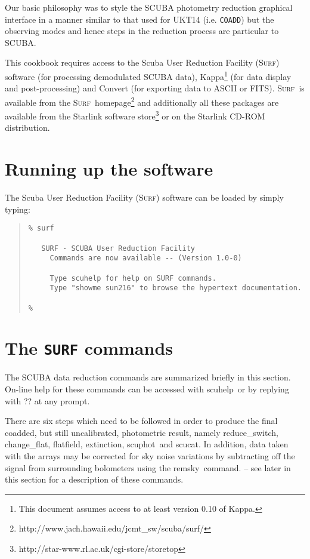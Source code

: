 \documentclass[twoside,11pt,fleqn]{article}
\newenvironment{myquote}{\begin{quote}\begin{small}}{\end{small}\end{quote}}
\newcommand{\Kappa}{\xref{{\sc Kappa}}{sun95}{}}
\newcommand{\convert}{\xref{{\sc Convert}}{sun55}{}}
\newcommand{\surf}{\xref{\textsc{Surf}}{sun216}{}}
\newcommand{\task}[1]{{\sf #1}}
\newcommand{\chgflat}{\xref{\task{change\_flat}}{sun216}{CHANGE_FLAT}}
\newcommand{\resw}{\xref{\task{reduce\_switch}}{sun216}{REDUCE_SWITCH}}
\newcommand{\flatf}{\xref{\task{flatfield}}{sun216}{FLATFIELD}}
\newcommand{\scuphot}{\xref{\task{scuphot}}{sun216}{SCUPHOT}}
\newcommand{\ext}{\xref{\task{extinction}}{sun216}{EXTINCTION}}
\newcommand{\scuhelp}{\xref{\task{scuhelp}}{sun216}{SCUHELP}}
\newcommand{\remsky}{\xref{\task{remsky}}{sun216}{REMSKY}}
\newcommand{\scucat}{\xref{\task{scucat}}{sun216}{SCUCAT}}
\newcommand{\htmladdnormallinkfoot}[2]{#1\footnote{#2}}
\newcommand{\htmladdnormallink}[2]{#1}
\newcommand{\xref}[3]{#1}
\begin{document}
Our basic philosophy was to style the SCUBA photometry reduction
graphical interface in a manner similar to that used for UKT14 \cite{ukt14}
(i.e. {\tt COADD}) but the observing modes and hence steps in the
reduction process are particular to SCUBA. 

This cookbook requires access to the Scuba User Reduction Facility (\surf) software
\cite{surf} (for processing demodulated SCUBA data), \Kappa \cite{kappa}\footnote{This
document assumes access to at least version 0.10 of Kappa.} (for data display
and post-processing) and \convert\cite{convert} (for exporting data to ASCII or FITS).
\surf\ is available from the \surf\
\htmladdnormallinkfoot{homepage}{http://www.jach.hawaii.edu/jcmt\_sw/scuba/surf/} 
and additionally all these packages are available from the 
\htmladdnormallinkfoot{Starlink software store}{http://star-www.rl.ac.uk/cgi-store/storetop}
or on the \htmladdnormallink{Starlink}{http://star-www.rl.ac.uk} CD-ROM distribution.

\section{Running up the software}

The Scuba User Reduction Facility (\surf) software can be loaded
by simply typing:

\begin{myquote}
\begin{verbatim}
% surf
 
   SURF - SCUBA User Reduction Facility
     Commands are now available -- (Version 1.0-0)
 
     Type scuhelp for help on SURF commands.
     Type "showme sun216" to browse the hypertext documentation.

% 
\end{verbatim} 
\end{myquote}

\section{The {\tt SURF} commands}

The SCUBA data reduction commands are summarized briefly in this
section. On-line help for these commands can be accessed with \scuhelp\
or by replying with ?? at any prompt.

There are six steps which need to be followed in order to produce the final
coadded, but still uncalibrated, photometric result, namely \resw, \chgflat,
\flatf, \ext, \scuphot\ and \scucat. In addition, data taken with the arrays
may be corrected for sky noise variations by subtracting off the signal from
surrounding bolometers using the \remsky\ command. -- see later in this
section for a description of these commands.
\end{document}
